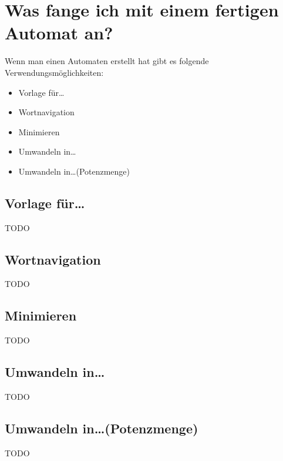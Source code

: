 \section{Was fange ich mit einem fertigen Automat an?}

Wenn man einen Automaten erstellt hat gibt es folgende
Ver\-wen\-dungs\-möglich\-keiten:

\begin{itemize}
  \item Vorlage für\ldots
  \item Wortnavigation
  \item Minimieren
  \item Umwandeln in\ldots
  \item Umwandeln in\ldots (Potenzmenge)
\end{itemize}

\subsection{Vorlage für\ldots}
  
  TODO
  
\subsection{Wortnavigation}
  
  TODO
  
\subsection{Minimieren}
  
  TODO
  
\subsection{Umwandeln in\ldots}
  
  TODO
  
\subsection{Umwandeln in\ldots (Potenzmenge)}
  
  TODO
  
  
